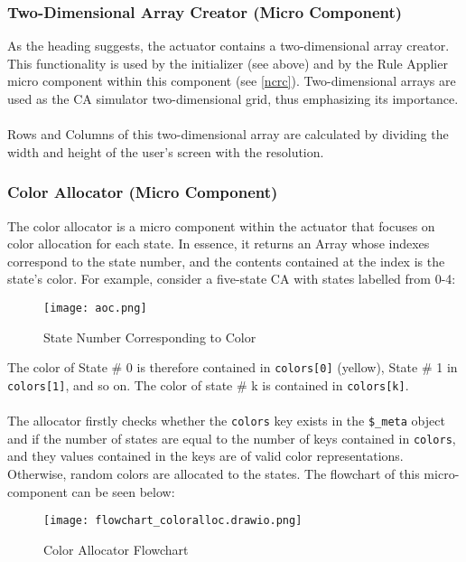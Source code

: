 \subsubsection{Two-Dimensional Array Creator (Micro Component)} \label{2darr_creator}
As the heading suggests, the actuator contains a two-dimensional array creator. This functionality is used by the initializer (see above) and by the Rule Applier micro component within this component (see \ref{ncrc}). Two-dimensional arrays are used as the CA simulator two-dimensional grid, thus emphasizing its importance. 
\\ \\
Rows and Columns of this two-dimensional array are calculated by dividing the width and height of the user's screen with the resolution.
\newpage
\subsubsection{Color Allocator (Micro Component)} \label{color_allocator}
The color allocator is a micro component within the actuator that focuses on color allocation for each state. In essence, it returns an Array whose indexes correspond to the state number, and the contents contained at the index is the state's color. For example, consider a five-state CA with states labelled from 0-4:
\begin{figure}[H]
    \caption{State Number Corresponding to Color}
    \centering
    \texttt{[image: aoc.png]}
\end{figure}
\noindent The color of State \# 0 is therefore contained in \texttt{colors[0]} (yellow), State \# 1 in \texttt{colors[1]}, and so on. The color of state \# k is contained in \texttt{colors[k]}.
\\ \\
The allocator firstly checks whether the \texttt{colors} key exists in the \texttt{\$\_meta} object and if the number of states are equal to the number of keys contained in \texttt{colors}, and they values contained in the keys are of valid color representations. Otherwise, random colors are allocated to the states. The flowchart of this micro-component can be seen below:
\\
\begin{figure}[H]
    \caption{Color Allocator Flowchart}
    \centering
    \texttt{[image: flowchart\_coloralloc.drawio.png]}
\end{figure}
\newpage
